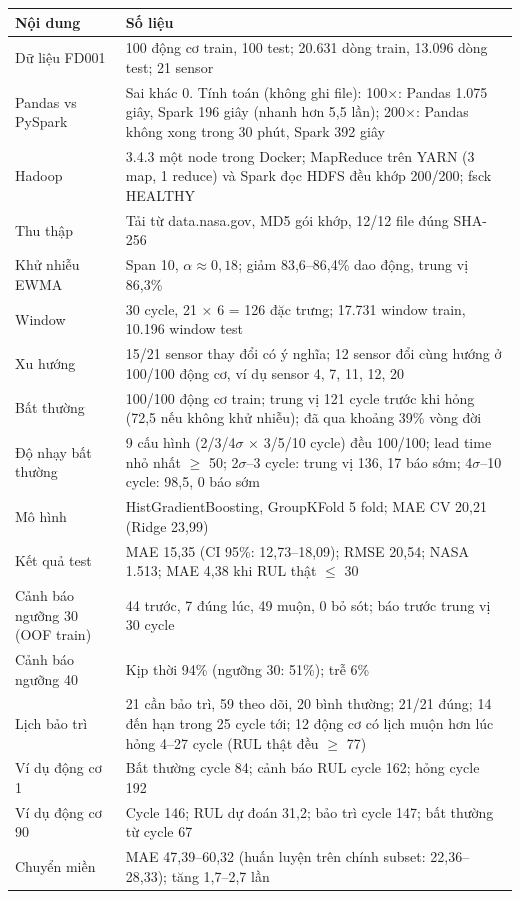 \documentclass[11pt,a4paper]{article}
\begin{document}
\begin{center}
\renewcommand{\arraystretch}{1.25}
\begin{tabularx}{\linewidth}{lX}
\toprule
Nội dung & Số liệu \\
\midrule
Dữ liệu FD001 & 100 động cơ train, 100 test; 20.631 dòng train, 13.096 dòng test; 21 sensor \\
Pandas vs PySpark & Sai khác 0. Tính toán (không ghi file): 100×: Pandas 1.075 giây, Spark 196 giây
(nhanh hơn 5,5 lần); 200×: Pandas không xong trong 30 phút, Spark 392 giây \\
Hadoop & 3.4.3 một node trong Docker; MapReduce trên YARN (3 map, 1 reduce) và Spark đọc HDFS đều khớp 200/200; fsck HEALTHY \\
Thu thập & Tải từ data.nasa.gov, MD5 gói khớp, 12/12 file đúng SHA-256 \\
Khử nhiễu EWMA & Span 10, $\alpha \approx 0{,}18$; giảm 83,6--86,4\% dao động, trung vị 86,3\% \\
Window & 30 cycle, 21 × 6 = 126 đặc trưng; 17.731 window train, 10.196 window test \\
Xu hướng & 15/21 sensor thay đổi có ý nghĩa; 12 sensor đổi cùng hướng ở 100/100 động cơ, ví dụ sensor 4, 7, 11, 12, 20 \\
Bất thường & 100/100 động cơ train; trung vị 121 cycle trước khi hỏng (72,5 nếu không khử nhiễu); đã qua khoảng 39\% vòng đời \\
Độ nhạy bất thường & 9 cấu hình (2/3/4$\sigma$ × 3/5/10 cycle) đều 100/100; lead time nhỏ nhất $\geq$ 50; 2$\sigma$--3 cycle: trung vị 136, 17 báo sớm; 4$\sigma$--10 cycle: 98,5, 0 báo sớm \\
Mô hình & HistGradientBoosting, GroupKFold 5 fold; MAE CV 20,21 (Ridge 23,99) \\
Kết quả test & MAE 15,35 (CI 95\%: 12,73--18,09); RMSE 20,54; NASA 1.513; MAE 4,38 khi RUL thật $\leq$ 30 \\
Cảnh báo ngưỡng 30 (OOF train) & 44 trước, 7 đúng lúc, 49 muộn, 0 bỏ sót; báo trước trung vị 30 cycle \\
Cảnh báo ngưỡng 40 & Kịp thời 94\% (ngưỡng 30: 51\%); trễ 6\% \\
Lịch bảo trì & 21 cần bảo trì, 59 theo dõi, 20 bình thường; 21/21 đúng; 14 đến hạn trong 25 cycle tới; 12 động cơ có lịch muộn hơn lúc hỏng 4--27 cycle (RUL thật đều $\geq$ 77) \\
Ví dụ động cơ 1 & Bất thường cycle 84; cảnh báo RUL cycle 162; hỏng cycle 192 \\
Ví dụ động cơ 90 & Cycle 146; RUL dự đoán 31,2; bảo trì cycle 147; bất thường từ cycle 67 \\
Chuyển miền & MAE 47,39--60,32 (huấn luyện trên chính subset: 22,36--28,33); tăng 1,7--2,7 lần \\
\bottomrule
\end{tabularx}
\end{center}
\end{document}
